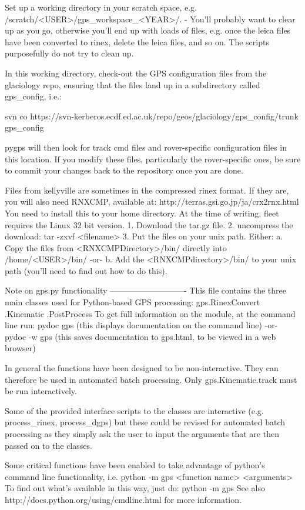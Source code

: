 \documentclass[11pt]{article} %
\begin{document}
Set up a working directory in your scratch space, e.g. /scratch/<USER>/gps_workspace_<YEAR>/.
 - You'll probably want to clear up as you go, otherwise you'll end up with loads of files, e.g. once the leica files have been converted to rinex, delete the leica files, and so on. The scripts purposefully do not try to clean up.
 
In this working directory, check-out the GPS configuration files from the glaciology repo, ensuring that the files land up in a subdirectory called gps_config, i.e.:

	svn co https://svn-kerberos.ecdf.ed.ac.uk/repo/geos/glaciology/gps_config/trunk gps_config
	
pygps will then look for track cmd files and rover-specific configuration files in this location. If you modify these files, particularly the rover-specific ones, be sure to commit your changes back to the repository once you are done.

Files from kellyville are sometimes in the compressed rinex format.
If they are, you will also need RNXCMP, available at:
 http://terras.gsi.go.jp/ja/crx2rnx.html
You need to install this to your home directory.
At the time of writing, fleet requires the Linux 32 bit version.
 1. Download the tar.gz file.
 2. uncompress the download:
		tar -zxvf <filename>
 3. Put the files on your unix path. Either:
     a. Copy the files from <RNXCMPDirectory>/bin/ directly into /home/<USER>/bin/ 
	 -or-
	 b. Add the <RNXCMPdirectory>/bin/ to your unix path (you'll need to find out how to do this).

	 
Note on gps.py functionality
----------------------------
This file contains the three main classes used for Python-based GPS processing:
	gps.RinexConvert
	   .Kinematic
	   .PostProcess
To get full information on the module, at the command line run:
	pydoc gps   (this displays documentation on the command line)
	 -or-
	pydoc -w gps   (this saves documentation to gps.html, to be viewed in a web browser)
	   
In general the functions have been designed to be non-interactive. They can therefore be used in automated batch processing. Only gps.Kinematic.track must be run interactively.

Some of the provided interface scripts to the classes are interactive (e.g. process_rinex, process_dgps) but these could be revised for automated batch processing as they simply ask the user to input the arguments that are then passed on to the classes.

Some critical functions have been enabled to take advantage of python's command line functionality, i.e.
	python -m gps <function name> <arguments>
To find out what's available in this way, just do:
	python -m gps
See also http://docs.python.org/using/cmdline.html for more information.
\end{document}
